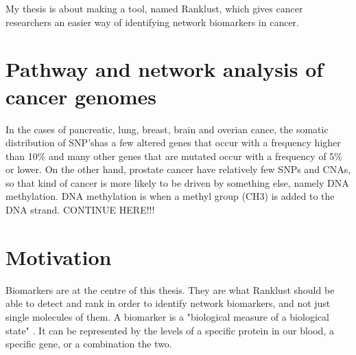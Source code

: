 \documentclass[UKenglish]{ifimaster}
\begin{document}
My thesis is about making a tool, named Ranklust, which gives cancer researchers
an easier way of identifying network biomarkers in cancer. 

\chapter{Pathway and network analysis of cancer genomes}
In the cases of pancreatic, lung, breast, brain and overian cance, the somatic
distribution of SNP'shas a few altered genes that occur with a frequency higher
than 10\% and many other genes that are mutated occur with a frequency of 5\% or
lower\cite{pathway-network}. On the other hand, prostate cancer have relatively
few SNPs and CNAs, so that kind of cancer is more likely to be driven by
something else, namely DNA methylation. DNA methylation is when a methyl group
(CH3) is added\cite{dna-methyl} to the DNA strand. CONTINUE HERE!!!

\chapter{Motivation}
Biomarkers are at the centre of this thesis. They are what Ranklust should be
able to detect and rank in order to identify network biomarkers, and not just
single molecules of them. A biomarker is a "biological measure of a biological
state" \cite{biomarker1}. It can be represented by the levels of a specific
protein in our blood, a specific gene, or a combination the two.
\end{document}

